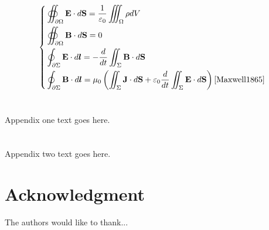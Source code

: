 \documentclass{wsdcr}
\begin{document}
\begin{equation}
\left\{
\begin{aligned}
    &\oiint_{\partial\Omega}{\mathbf{E}\cdot d\mathbf{S}}=\frac 1{\varepsilon_0}\iiint_\Omega{\rho dV}\\
    &\oiint_{\partial\Omega}{\mathbf{B}\cdot d\mathbf{S}}=0\\
    &\oint_{\partial\Sigma}{\mathbf{E}\cdot d\boldsymbol{l}}=-\frac d{dt} \iint_\Sigma{{\mathbf{B}\cdot d\mathbf{S}}}\\
    &\oint_{\partial\Sigma}{\mathbf{B}\cdot d\boldsymbol{l}}=\mu_0 \left(\iint_\Sigma{{\mathbf{J}\cdot d\mathbf{S}}}+\varepsilon_0\frac d{dt} \iint_\Sigma{{\mathbf{E}\cdot d\mathbf{S}}}\right)\cite{Maxwell1865}
\end{aligned}
\right.
\end{equation}

\appendices
\section{}
Appendix one text goes here.

\section{}
Appendix two text goes here.


\section*{Acknowledgment}
The authors would like to thank...



\end{document}
